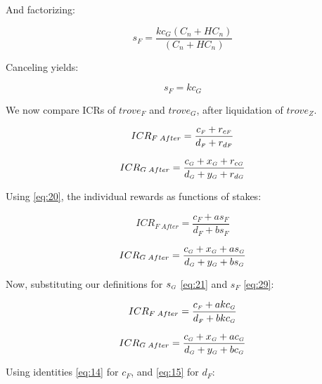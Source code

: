 \documentclass[reqno]{article}
\begin{document}
\bigskip
And factorizing:

\begin{equation} 
    s_F=\frac{kc_G(C_n+HC_n)}{(C_n+HC_n)}
\end{equation}

\bigskip
Canceling yields:

\begin{equation} \label{eq:29}
    s_F=kc_G
\end{equation}

\bigskip
We now compare ICRs of $trove_F$ and $trove_G$, after liquidation of $trove_Z$.

\begin{equation} 
    ICR_{F \; After}=\frac{c_\mathsmaller{F}+r_{c\mathsmaller{F}}}{d_\mathsmaller{F}+r_{d\mathsmaller{F}}}
\end{equation}

\begin{equation} 
    ICR_{G \; After}=\frac{c_\mathsmaller{G}+x_\mathsmaller{G}+r_{c\mathsmaller{G}}}{d_\mathsmaller{G}+y_\mathsmaller{G}+r_{d\mathsmaller{G}}}
\end{equation}

\bigskip
Using \ref{eq:20}, the individual rewards as functions of stakes:

\begin{equation} 
    ICR_{F \; After}=\frac{c_F+as_F}{d_F+bs_F}
\end{equation}

\begin{equation} 
    ICR_{G \; After}=\frac{c_\mathsmaller{G}+x_\mathsmaller{G}+as_\mathsmaller{G}}{d_\mathsmaller{G}+y_\mathsmaller{G}+bs_\mathsmaller{G}}
\end{equation}

\bigskip
Now, substituting our definitions for $s_\mathsmaller{G}$ \ref{eq:21} and $s_F$ \ref{eq:29}:

\begin{equation} 
    ICR_{F \; After}=\frac{c_\mathsmaller{F}+akc_\mathsmaller{G}}{d_\mathsmaller{F}+bkc_\mathsmaller{G}}
\end{equation}

\begin{equation} 
    ICR_{G \; After}=\frac{c_\mathsmaller{G}+x_\mathsmaller{G}+ac_\mathsmaller{G}}{d_\mathsmaller{G}+y_\mathsmaller{G}+bc_\mathsmaller{G}}
\end{equation}

\bigskip
Using identities \ref{eq:14} for $c_F$, and \ref{eq:15} for $d_F$:
\end{document}
